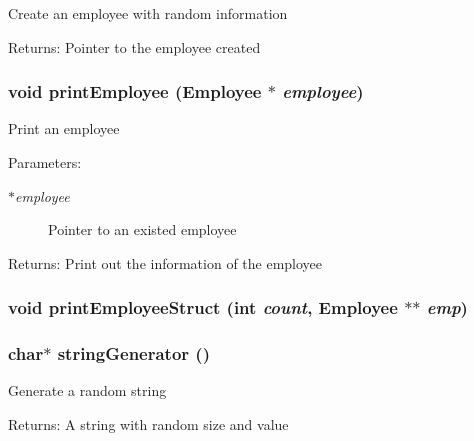 Create an employee with random information \begin{Desc}
\item[Returns:]Pointer to the employee created \end{Desc}
\subsubsection{\setlength{\rightskip}{0pt plus 5cm}void print\-Employee (\bf{Employee} $\ast$ {\em employee})}\label{employee_8h_a28c4b8e4929dadc3d00cd55a2469e60}


Print an employee \begin{Desc}
\item[Parameters:]
\begin{description}
\item[{\em $\ast$employee}]Pointer to an existed employee \end{description}
\end{Desc}
\begin{Desc}
\item[Returns:]Print out the information of the employee \end{Desc}
\subsubsection{\setlength{\rightskip}{0pt plus 5cm}void print\-Employee\-Struct (int {\em count}, \bf{Employee} $\ast$$\ast$ {\em emp})}\label{employee_8h_06927df00f1150e177055b6bf59b8683}


\subsubsection{\setlength{\rightskip}{0pt plus 5cm}char$\ast$ string\-Generator ()}\label{employee_8h_1d49fd707de5e39732601ab0105d580a}


Generate a random string \begin{Desc}
\item[Returns:]A string with random size and value \end{Desc}
